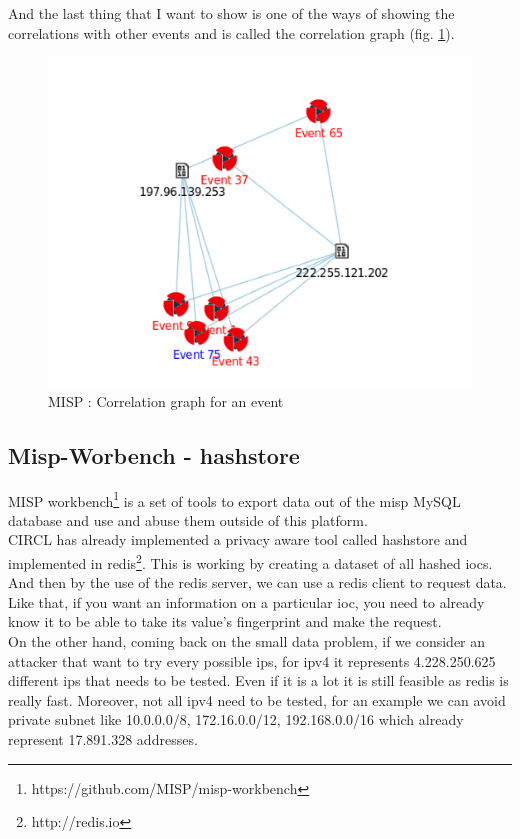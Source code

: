 \documentclass{eplmastersthesis}
\begin{document}
And the last thing that I want to show is one of the ways of showing the correlations with other events and is called the correlation graph (fig. \ref{webcorrelation}).
\begin{figure}[!h]
	\begin{center}
		\includegraphics[scale=0.35]{res/webCorrelationGraph}
		\caption{MISP : Correlation graph for an event}
		\label{webcorrelation}
	\end{center}
\end{figure}

\subsection{Misp-Worbench - hashstore}

MISP workbench\footnote{https://github.com/MISP/misp-workbench} is a set of tools to export data out of the \gls{misp} MySQL database and use and abuse them outside of this platform.\\

CIRCL has already implemented a privacy aware tool called hashstore and implemented in redis\footnote{http://redis.io}. This is working by creating a dataset of all hashed \gls{ioc}s. And then by the use of the redis server, we can use a redis client to request data.\\
Like that, if you want an information on a particular \gls{ioc}, you need to already know it to be able to take its value's fingerprint and make the request.\\
On the other hand, coming back on the small data problem, if we consider an attacker that want to try every possible \gls{ip}s, for \gls{ipv4} it represents 4.228.250.625 different \gls{ip}s that needs to be tested. Even if it is a lot it is still feasible as redis is really fast. Moreover, not all \gls{ipv4} need to be tested, for an example we can avoid private subnet like 10.0.0.0/8, 172.16.0.0/12, 192.168.0.0/16 which already represent 17.891.328 addresses.
\end{document}
